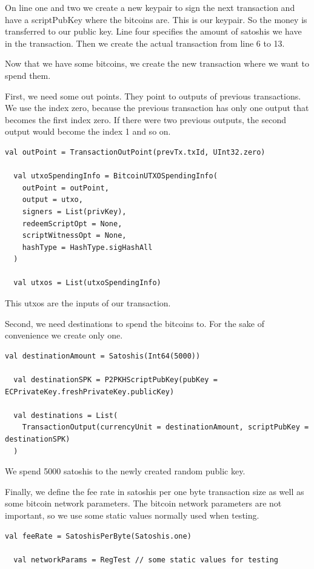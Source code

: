 \documentclass[runningheads]{llncs}
\begin{document}
On line one and two we create a new keypair to sign the next
transaction and have a scriptPubKey where the bitcoins are.  This is
our keypair.  So the money is transferred to our public key.  Line
four specifies the amount of satoshis we have in the transaction.
Then we create the actual transaction from line 6 to 13.

Now that we have some bitcoins, we create the new transaction where we
want to spend them.

First, we need some out points.  They point to outputs of previous
transactions.  We use the index zero, because the previous transaction
has only one output that becomes the first index zero.  If there were
two previous outputs, the second output would become the index 1 and
so on.
\begin{lstlisting}[style=scala]
  val outPoint = TransactionOutPoint(prevTx.txId, UInt32.zero)

  val utxoSpendingInfo = BitcoinUTXOSpendingInfo(
    outPoint = outPoint,
    output = utxo,
    signers = List(privKey),
    redeemScriptOpt = None,
    scriptWitnessOpt = None,
    hashType = HashType.sigHashAll
  )

  val utxos = List(utxoSpendingInfo)
\end{lstlisting}

This utxos are the inputs of our transaction.

Second, we need destinations to spend the bitcoins to.
For the sake of convenience we create only one.
\begin{lstlisting}[style=scala]
  val destinationAmount = Satoshis(Int64(5000))

  val destinationSPK = P2PKHScriptPubKey(pubKey = ECPrivateKey.freshPrivateKey.publicKey)

  val destinations = List(
    TransactionOutput(currencyUnit = destinationAmount, scriptPubKey = destinationSPK)
  )
\end{lstlisting}

We spend 5000 satoshis to the newly created random public key.

Finally, we define the fee rate in satoshis per one byte transaction
size as well as some bitcoin network parameters.  The bitcoin network
parameters are not important, so we use some static values normally
used when testing.

\begin{lstlisting}[style=scala]
  val feeRate = SatoshisPerByte(Satoshis.one)

  val networkParams = RegTest // some static values for testing
\end{lstlisting}
\end{document}
